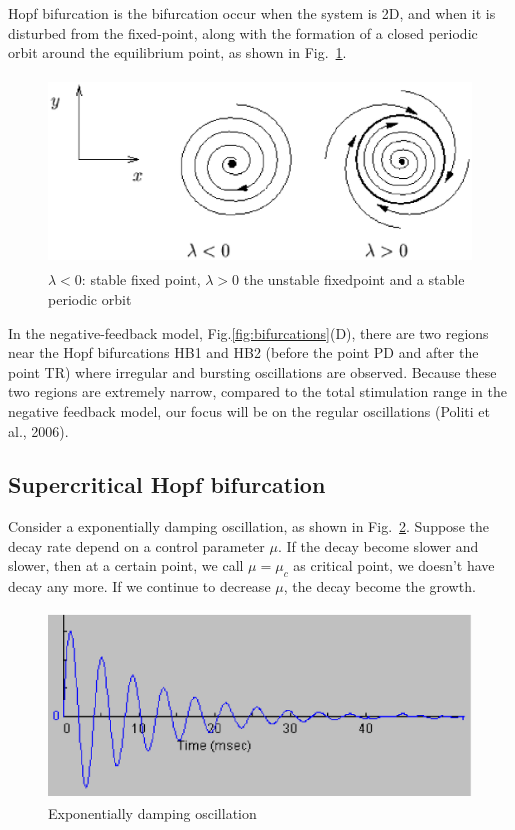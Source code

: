 Hopf bifurcation is the bifurcation occur when the system is 2D, and
when it is disturbed from the fixed-point, along with the formation of
a closed periodic orbit around the equilibrium point, as shown in
Fig.~\ref{fig:Hopf_bifurcation}.

\begin{figure}[hbt]
  \centerline{\includegraphics[height=5cm,
    angle=0]{./images/Hopf_bifurcation.eps}}
\caption{$\lambda<0$: stable fixed point, $\lambda>0$ the unstable
  fixedpoint and a stable periodic orbit}
\label{fig:Hopf_bifurcation}
\end{figure}

In the negative-feedback model, Fig.\ref{fig:bifurcations}(D), there are two
regions near the Hopf bifurcations HB1 and HB2 (before the point PD and after
the point TR) where irregular and bursting oscillations are observed.
Because these two regions are extremely narrow, compared to the total
stimulation range in the negative feedback model, our focus will be on the
regular oscillations (Politi et al., 2006).

\subsection{Supercritical Hopf bifurcation}
\label{sec:supercr-hopf-bifurc}


Consider a exponentially damping oscillation, as shown in
Fig.~\ref{fig:exp_damp_osci}. Suppose the decay rate depend on a
control parameter $\mu$. If the decay become slower and slower, then
at a certain point, we call $\mu=\mu_c$ as critical point, we doesn't
have decay any more. If we continue to decrease $\mu$, the decay
become the growth.

\begin{figure}[hbt]
  \centerline{\includegraphics[height=5cm,
    angle=0]{./images/exp_damp_osci.eps}}
\caption{Exponentially damping oscillation}
\label{fig:exp_damp_osci}
\end{figure}

